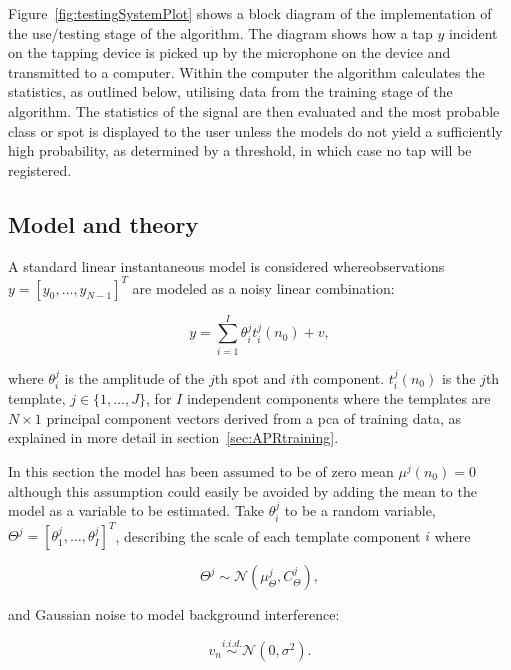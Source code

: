 Figure~\ref{fig:testingSystemPlot} shows a block diagram of the implementation of the use/testing stage of the algorithm. The diagram shows how a tap $y$ incident on the tapping device is picked up by the microphone on the device and transmitted to a computer. Within the computer the algorithm calculates the statistics, as outlined below, utilising data from the training stage of the algorithm. The statistics of the signal are then evaluated and the most probable class or spot is displayed to the user unless the models do not yield a sufficiently high probability, as determined by a threshold, in which case no tap will be registered.

\subsection{Model and theory}
A standard linear instantaneous model is considered where\linebreak[0] observations \linebreak[2]$y = [y_0, \ldots , y_{N-1}]^T $ are modeled as a noisy linear combination:

\begin{equation}\label{eq:mod1}
y = \sum_{i=1}^{I} \theta_i^j t_i^j(n_0) + v,
\end{equation}

where $\theta_i^j$ is the amplitude of the $j$th spot and $i$th component. $t_i^j(n_0)$ is the $j$th template, $j \in \{1, \ldots ,J\}$, for $I$ independent components where the templates are $N \times 1$ principal component vectors derived from a \gls{pca} of training data, as explained in more detail in section~\ref{sec:APRtraining}.

In this section the model has been assumed to be of zero mean $\mu^j(n_0) =0$ although this assumption could easily be avoided by adding the mean to the model as a variable to be estimated. Take $\theta_i^j$ to be a random variable, $\Theta^j = [\theta_1^j,\ldots,\theta_I^j]^T$, describing the scale of each template component $i$ where

\begin{equation}\label{eq:theta}
\Theta^j \sim \mathcal{N}(\mu_{\Theta}^j,C_{\Theta}^j),
\end{equation}

and Gaussian noise to model background interference:

\begin{equation}\label{eq:noisePCA}
v_n \stackrel{i.i.d.}{\sim} \mathcal{N}(0,\sigma^2).
\end{equation}


